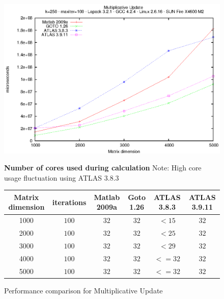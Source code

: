 \documentclass[a4paper,10pt]{scrartcl}
\begin{document}
	\begin{figure}
		\label{Figure1}	
		\includegraphics{nmf_mu.eps}\newline

		
		\textbf{Number of cores used during calculation}\newline
		Note: High core usage fluctuation using ATLAS 3.8.3\newline

		\begin{tabular}{|c|c|c|c|c|c|}
			\hline
			Matrix dimension & iterations & Matlab 2009a & Goto 1.26 & ATLAS 3.8.3 & ATLAS 3.9.11\\
			\hline
			1000 & $100$ & $32$ & $32$ & $<15$ & $32$\\
			2000 & $100$ & $32$ & $32$ & $<25$ & $32$ \\
			3000 & $100$ & $32$ & $32$ & $<29$ & $32$\\
			4000 & $100$ & $32$ & $32$ & $<=32$ & $32$\\
			5000 & $100$ & $32$ & $32$ & $<=32$ & $32$\\
			\hline
		\end{tabular}
		\caption{Performance comparison for Multiplicative Update}
	\end{figure}

	
\end{document}
